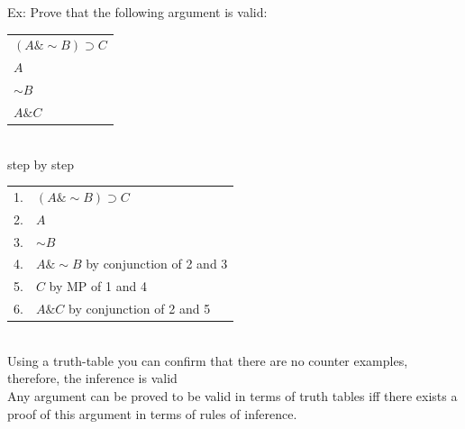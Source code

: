 \documentclass[11pt, fleqn]{article}
\newcommand{\argument}[2]{\begin{tabular}{p{#1 cm}} #2 \end{tabular}}
\begin{document}
 Ex: Prove that the following argument is valid:\\
 \argument{3}{$(A\&\sim B)\supset C$\\
 $A$\\
 $\sim B$\\
 \hline
 $A\& C$}\\
 step by step\\
\begin{tabular}{cl}
    1. & $(A\&\sim B)\supset C$\\
    2. & $A$\\
    3. & $\sim B$\\
    \hline
    4. & $A\& \sim B$ by conjunction of 2 and 3\\
    5. & $C$ by MP of 1 and 4\\
    6. & $A\& C$ by conjunction of 2 and 5
\end{tabular}\\
Using a truth-table you can confirm that there are no counter examples, therefore, the inference is valid\\
Any argument can be proved to be valid in terms of truth tables iff there exists a proof of this argument in terms of rules of inference.\\
\end{document}
